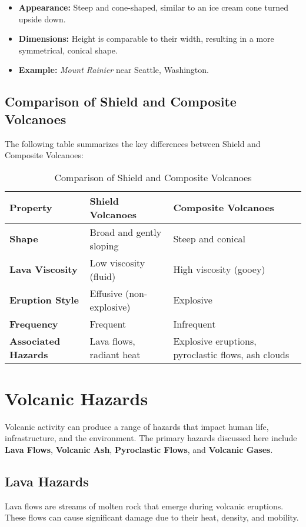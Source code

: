 \documentclass{article}
\begin{document}
\begin{itemize}[leftmargin=*, label={--}]
    \item \textbf{Appearance:} Steep and cone-shaped, similar to an ice cream cone turned upside down.
    \item \textbf{Dimensions:} Height is comparable to their width, resulting in a more symmetrical, conical shape.
    \item \textbf{Example:} \textit{Mount Rainier} near Seattle, Washington.
\end{itemize}

\subsection{Comparison of Shield and Composite Volcanoes}
The following table summarizes the key differences between Shield and Composite Volcanoes:

\begin{table}[h]
\centering
\caption{Comparison of Shield and Composite Volcanoes}
\begin{tabular}{@{}lll@{}}
\toprule
\textbf{Property}         & \textbf{Shield Volcanoes} & \textbf{Composite Volcanoes} \\ \midrule
\textbf{Shape}            & Broad and gently sloping & Steep and conical            \\
\textbf{Lava Viscosity}    & Low viscosity (fluid)    & High viscosity (gooey)      \\
\textbf{Eruption Style}   & Effusive (non-explosive) & Explosive                    \\
\textbf{Frequency}        & Frequent                & Infrequent                  \\
\textbf{Associated Hazards}& Lava flows, radiant heat & Explosive eruptions, pyroclastic flows, ash clouds \\ \bottomrule
\end{tabular}
\end{table}

\section{Volcanic Hazards}
Volcanic activity can produce a range of hazards that impact human life, infrastructure, and the environment. The primary hazards discussed here include \textbf{Lava Flows}, \textbf{Volcanic Ash}, \textbf{Pyroclastic Flows}, and \textbf{Volcanic Gases}.

\subsection{Lava Hazards}
Lava flows are streams of molten rock that emerge during volcanic eruptions. These flows can cause significant damage due to their heat, density, and mobility.
\end{document}

